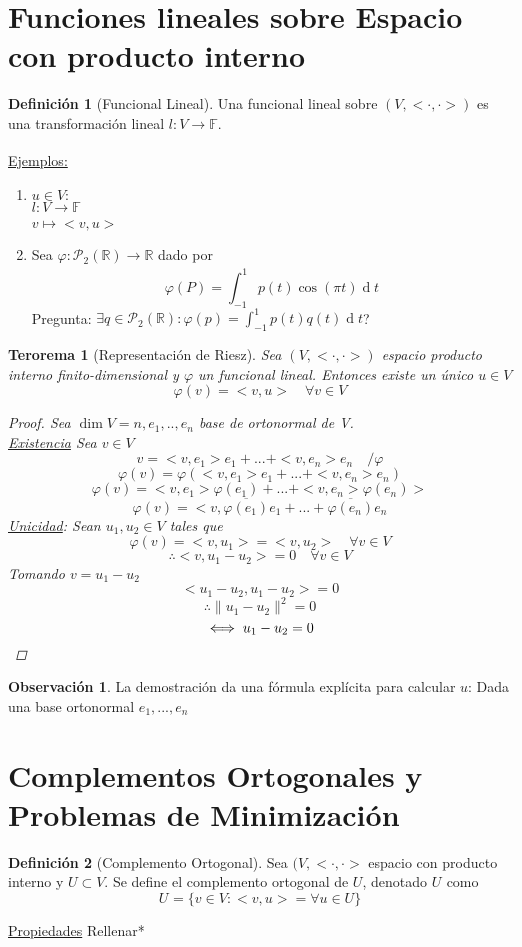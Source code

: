 \documentclass[11pt]{book}
\renewcommand{\d}[1]{\ensuremath{\operatorname{d}\!{#1}}}
\newcommand{\set}[1]{\mathbb{#1}}
\newcommand{\func}[5]{#1:#2\xrightarrow[#5]{#4}#3}
\newtheorem{thm}{Terorema}[section]
\theoremstyle{definition}
\newtheorem{defn}{Definición}[section]
\newtheorem{obs}{Observación}[section]
\begin{document}
\section{Funciones lineales sobre Espacio con producto interno}
\begin{defn}[Funcional Lineal]
	Una funcional lineal sobre $(V,<\cdot,\cdot>)$ es una transformación lineal $\func{l}{V}{\set{F}}{}{}$.
\end{defn}
\underline{Ejemplos:}
\begin{enumerate}
	\item $u\in V:$\\
	$\func{l}{V}{\set{F}}{}{}$\\
	$v\mapsto <v,u>$

	\item Sea $\func{\varphi}{\mathcal{P}_2(\set{R})}{\set{R}}{}{}$ dado por
	\[\varphi(P)=\int^1_{-1}p(t)\cos(\pi t)\d{t}\]
	Pregunta: $\exists q\in\mathcal{P}_2(\set{R}):\varphi(p)=\int^1_{-1}p(t)q(t)\d{t}$?
\end{enumerate}
\begin{thm}[Representación de Riesz]
	Sea $(V,<\cdot,\cdot>)$ espacio producto interno finito-dimensional y $\varphi$ un funcional lineal. Entonces existe un único $u\in V$
	\[\varphi(v)=<v,u>\quad\forall v\in V\]
	\begin{proof}
		Sea $\dim V=n, e_1,..,e_n$ base de ortonormal de V.\\
		\underline{Existencia} Sea $v\in V$
		\[v=<v,e_1>e_1+...+<v,e_n>e_n\quad/\varphi\]
		\[\varphi(v)=\varphi(<v,e_1>e_1+...+<v,e_n>e_n)\]
		\[\varphi(v)=<v,e_1>\varphi(e_1)+...+<v,e_n>\varphi(e_n)>\]
		\[\varphi(v)=<v,\overline{\varphi(e_1)}e_1+...+\overline{\varphi(e_n)}e_n\]
		\underline{Unicidad}: Sean $u_1,u_2\in V$ tales que
		\[\varphi(v)=<v,u_1>=<v,u_2>\quad\forall v\in V\]
		\[\therefore <v,u_1-u_2>=0\quad\forall v\in V\]
		Tomando $v=u_1-u_2$
		\[<u_1-u_2,u_1-u_2>=0\]
		\[\therefore\|u_1-u_2\|^2=0\]
		\[\iff u_1-u_2=0\qedhere\]
	\end{proof}
\end{thm}
\begin{obs}
	La demostración da una fórmula explícita para calcular $u$: Dada una base ortonormal $e_1,...,e_n$
\end{obs}
\section{Complementos Ortogonales y Problemas de Minimización}
\begin{defn}[Complemento Ortogonal]
	Sea $(V,<\cdot,\cdot>$ espacio con producto interno y $U\subset V$. Se define el complemento ortogonal de $U$, denotado $U^{}$ como
	\[U^{}=\{v\in V:<v,u>=\forall u\in U\}\]
\end{defn}
\underline{Propiedades}
Rellenar*
\end{document}
